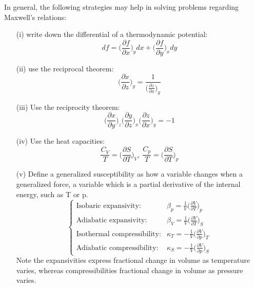 \documentclass[a4paper,11pt,oneside]{book}
\begin{document}
In general, the following strategies may help in solving problems regarding Maxwell's relations:
\begin{enumerate}
    \item[(i)] write down the differential of a thermodynamic potential:
    \begin{equation}
         df = \bigg(\frac{\partial f}{\partial x}\bigg)_y dx + \bigg(\frac{\partial f}{\partial y}\bigg)_x dy
    \end{equation}
    \item[(ii)] use the reciprocal theorem:
    \begin{equation}
        \bigg(\frac{\partial x}{\partial z}\bigg)_y=\frac{1}{ \big(\frac{\partial z}{\partial x}\big)_y}
    \end{equation}
    \item[(iii)] Use the reciprocity theorem:
    \begin{equation}
         \bigg(\frac{\partial x}{\partial y}\bigg)_z \bigg(\frac{\partial y}{\partial z}\bigg)_x \bigg(\frac{\partial z}{\partial x}\bigg)_y=-1
    \end{equation}
    \item[(iv)] Use the heat capacities:
    \begin{equation}
        \frac{C_V}{T}= \bigg(\frac{\partial S}{\partial T}\bigg)_V, \  \frac{C_p}{T}= \bigg(\frac{\partial S}{\partial T}\bigg)_p 
    \end{equation}
    \item[(v)] Define a generalized susceptibility as how a variable changes when a generalized force, a variable which is a partial derivative of the internal energy, such as T or p. 
    \begin{equation}
    \begin{cases}
    \text{Isobaric expansivity}: & \beta_p = \frac{1}{V}\big(\frac{\partial V}{\partial T}\big)_p \\[15pt]
    \text{Adiabatic expansivity}: & \beta_V = \frac{1}{V}\big(\frac{\partial V}{\partial T}\big)_S\\[15pt]
    \text{Isothermal compressibility}: & \kappa_T = -\frac{1}{V}\big(\frac{\partial V}{\partial p}\big)_T \\[15pt]
    \text{Adiabatic compressibility}: & \kappa_S = -\frac{1}{V}\big(\frac{\partial V}{\partial p}\big)_S
    \end{cases}
\end{equation}
Note the expansivities express fractional change in volume as temperature varies, whereas compressibilities fractional change in volume as pressure varies. 
\end{enumerate}
\end{document}
